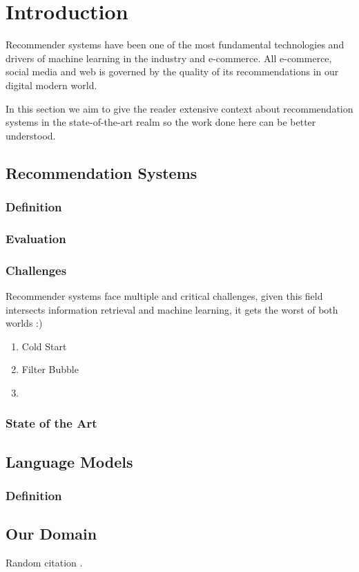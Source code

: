 
\chapter{Introduction}
\label{chp:intro}

Recommender systems have been one of the most fundamental technologies and drivers of machine learning in the industry and e-commerce. All e-commerce, social media and web is governed by the quality of its recommendations in our digital modern world. 

In this section we aim to give the reader extensive context about recommendation systems in the state-of-the-art realm so the work done here can be better understood.

\section{Recommendation Systems}
\subsection{Definition}

\subsection{Evaluation}

\subsection{Challenges}

Recommender systems face multiple and critical challenges, given this field intersects information retrieval and machine learning, it gets the worst of both worlds :) 

\begin{enumerate}
    \item Cold Start
    \item Filter Bubble
    \item
\end{enumerate}

\subsection{State of the Art}

\section{Language Models}

\subsection{Definition}



\section{Our Domain}

Random citation \cite{goodfellow2016deep}.